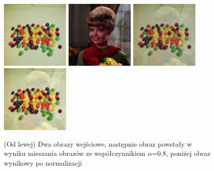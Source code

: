 \documentclass[final,a4paper,openany,12pt]{mwbk}
\begin{document}
\begin{figure}[H]
	\begin{center}
		\includegraphics[width=0.3\textwidth]{2/2Color_Mix_Img1_Original}
		\includegraphics[width=0.3\textwidth]{2/2Color_Mix_Img2_Original}
		\includegraphics[width=0.3\textwidth]{2/2Color_Mix_Img_Result}
		\includegraphics[width=0.3\textwidth]{2/2Color_Mix_Img_Result_Norm}
	\end{center}
	\caption{(Od lewej) Dwa obrazy wejściowe, następnie obraz powstały w wyniku mieszania obrazów ze współczynnikiem $\alpha$=0.8, poniżej obraz wynikowy po normalizacji }
\end{figure}
\end{document}
